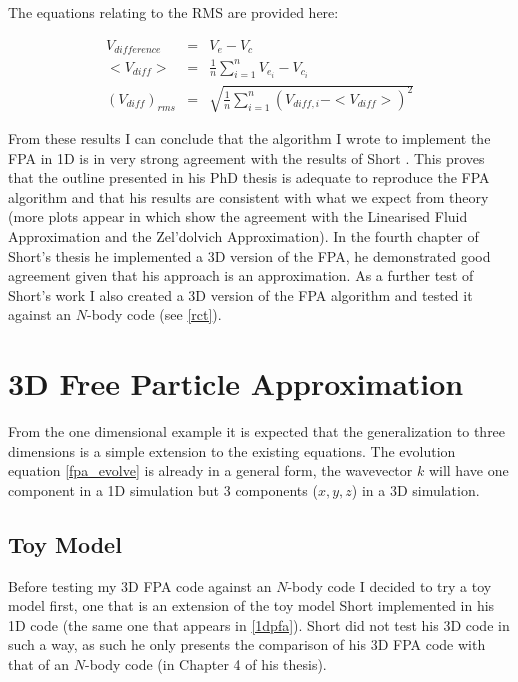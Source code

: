 The equations relating to the RMS are provided here:

\begin{eqnarray}
 V_{difference} &=& V_e - V_c \nonumber \\
 < V_{diff} >  &=& \frac{1}{n} \sum_{i=1}^{n} V_{e_i} - V_{c_i} \nonumber \\
 (V_{diff})_{rms} &=& \sqrt{ \frac{1}{n} \sum_{i=1}^{n} (V_{diff,i} - < V_{diff} >)^2 }
\end{eqnarray}


From these results I can conclude that the algorithm I wrote to implement the FPA in 1D is in very strong agreement with the results of Short \citep{bib_short}. This proves that the outline presented in his PhD thesis is adequate to reproduce the FPA algorithm and that his results are consistent with what we expect from theory (more plots appear in \citet{bib_short} which show the agreement with the Linearised Fluid Approximation and the Zel'dolvich Approximation). In the fourth chapter of Short's thesis he implemented a 3D version of the FPA, he demonstrated good agreement given that his approach is an approximation. As a further test of Short's work I also created a 3D version of the FPA algorithm and tested it against an $N$-body code (see \ref{rct}).

\section{3D Free Particle Approximation}
From the one dimensional example it is expected that the generalization to three dimensions is a simple extension to the existing equations. The evolution equation \ref{fpa_evolve} is already in a general form, the wavevector $k$ will have one component in a 1D simulation but 3 components ($x,y,z$) in a 3D simulation.

\subsection{Toy Model}
Before testing my 3D FPA code against an $N$-body code I decided to try a toy model first, one that is an extension of the toy model Short implemented in his 1D code (the same one that appears in \ref{1dpfa}). Short did not test his 3D code in such a way, as such he only presents the comparison of his 3D FPA code with that of an $N$-body code (in Chapter 4 of his thesis).


